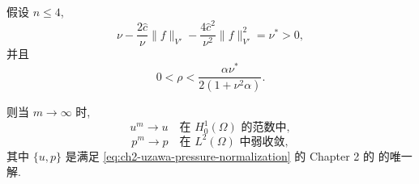 \begin{Proposition}
\label{prop:ch2-arrow-hurwicz-convergence}
假设 $n\leq4$,
\begin{equation}
\nu-\frac{2\widehat c}\nu\lVert f\rVert_{V'}
-\frac{4\widehat c^2}{\nu^2}\lVert f\rVert_{V'}^2
=\nu^*>0,
\label{eq:ch2-arrow-hurwicz-coercivity-condition}
\end{equation}
并且
\begin{equation}
0<\rho<\frac{\alpha\nu^*}{2(1+\nu^2\alpha)}.
\label{eq:ch2-arrow-hurwicz-step-condition}
\end{equation}

\hypertarget{chapter-02-page-165}{}
则当 $m\to\infty$ 时,
\begin{equation}
u^m\longrightarrow u\quad\text{在 }H_0^1(\Omega)\text{ 的范数中},
\label{eq:ch2-arrow-hurwicz-velocity-convergence}
\end{equation}
\begin{equation}
p^m\longrightarrow p\quad\text{在 }L^2(\Omega)\text{ 中弱收敛},
\label{eq:ch2-arrow-hurwicz-pressure-convergence}
\end{equation}
其中 $\{u,p\}$ 是满足 \eqref{eq:ch2-uzawa-pressure-normalization} 的 Chapter 2 的  的唯一解.
\end{Proposition}

